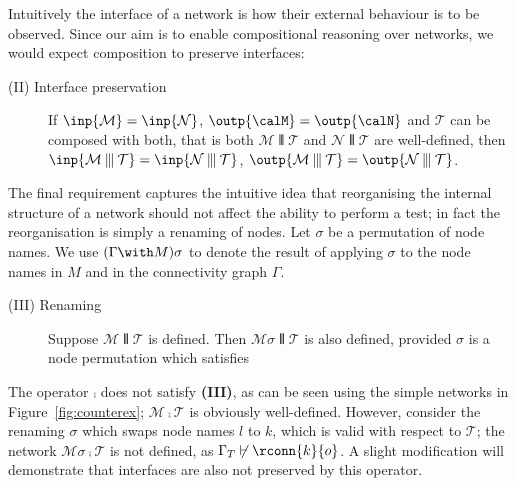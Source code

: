 \documentclass{LMCS}
\begin{document}
Intuitively the interface of a network is how their external behaviour
is to be observed. Since our aim is to enable 
compositional reasoning over networks, we would expect composition to preserve
interfaces:
\begin{description}
\item[(II) Interface preservation] If $\inp{{\mathcal M}} = \inp{{\mathcal
      N}}$, $\outp{\calM} = \outp{\calN}$ and ${\mathcal T}$ can be composed with both,  that is both 
       ${\mathcal M} \interleave {\mathcal T}$ and ${\mathcal N} \interleave {\mathcal T}$
are well-defined,  then $\inp{{\mathcal
      M} \interleave {\mathcal T}} = \inp{{\mathcal N} \interleave {\mathcal
      T}}$, 
      $\outp{{\mathcal M} \interleave {\mathcal T}} = \outp{{\mathcal N} \interleave {\mathcal
      T}}$.
\end{description}

The final requirement captures the intuitive idea that reorganising
the internal structure of a network should not affect the ability to
perform a test; in fact the reorganisation is simply a renaming of
nodes. Let $\sigma$ be a permutation of node names. We use $(\Gamma
\with M)\sigma$ to denote the result of applying $\sigma$ to the node
names in $M$ and in the connectivity graph $\Gamma$.
\begin{description}
\item[(III) Renaming] Suppose ${\mathcal M} \interleave {\mathcal T}$ is
  defined. Then ${\mathcal M}\sigma
  \interleave {\mathcal T}$ is also defined, provided $\sigma$ is a node permutation
  which satisfies
\end{description}

\begin{exa}
The operator $\comp$ does not satisfy \textbf{(III)}, as can be
seen using the simple networks in Figure~\ref{fig:counterex}; ${\mathcal M} \comp {\mathcal T}$
is obviously well-defined. However, consider the renaming $\sigma$ which swaps node names $l$ to $k$, which is valid with respect to 
$\mathcal T$; the network ${\mathcal M\sigma} \comp {\mathcal T}$ is not defined, as $\Gamma_T \not\vdash \rconn{k}{o}$.
A slight modification will demonstrate that interfaces are also not preserved by this operator. 
\end{exa}
\end{document}
